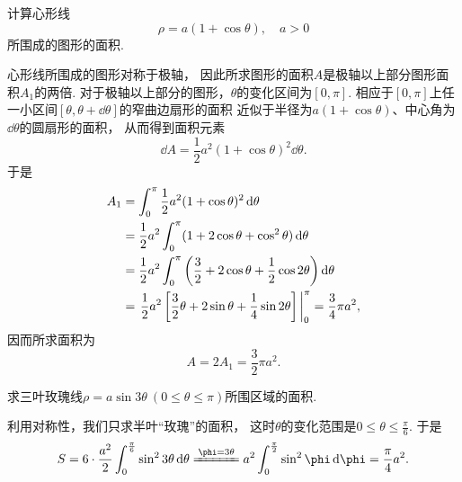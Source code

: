 \begin{example}
计算心形线\begin{equation*}
	\rho = a (1 + \cos\theta), \quad a>0
\end{equation*}所围成的图形的面积.
\begin{solution}
心形线所围成的图形对称于极轴，
因此所求图形的面积\(A\)是极轴以上部分图形面积\(A_1\)的两倍.
对于极轴以上部分的图形，\(\theta\)的变化区间为\([0,\pi]\).
相应于\([0,\pi]\)上任一小区间\([\theta,\theta+\dd{\theta}]\)的窄曲边扇形的面积
近似于半径为\(a (1 + \cos\theta)\)、中心角为\(\dd{\theta}\)的圆扇形的面积，
从而得到面积元素\begin{equation*}
	\dd{A} = \frac12 a^2 (1 + \cos\theta)^2 \dd{\theta}.
\end{equation*}
于是\begin{align*}
	A_1 &= \int_0^\pi \frac12 a^2 (1 + \cos\theta)^2 \dd{\theta} \\
	&= \frac12 a^2 \int_0^\pi (1 + 2\cos\theta + \cos^2\theta) \dd{\theta} \\
	&= \frac12 a^2 \int_0^\pi \left(\frac32 + 2 \cos\theta + \frac12 \cos2\theta\right) \dd{\theta} \\
	&= \eval{\frac12 a^2 \left[\frac32 \theta + 2 \sin\theta + \frac14 \sin2\theta\right]}_0^\pi
	= \frac34 \pi a^2,
\end{align*}
因而所求面积为\begin{equation*}
	A = 2 A_1 = \frac32 \pi a^2.
\end{equation*}
\end{solution}
\end{example}

\begin{example}
求三叶玫瑰线\(\rho = a \sin3\theta\ (0 \leq \theta \leq \pi)\)所围区域的面积.
\begin{solution}
利用对称性，我们只求半叶“玫瑰”的面积，
这时\(\theta\)的变化范围是\(0 \leq \theta \leq \frac\pi6\).
于是\begin{equation*}
	S = 6 \cdot \frac{a^2}2 \int_0^{\frac\pi6} \sin^23\theta \dd{\theta}
	\xlongequal{\phi=3\theta} a^2 \int_0^{\frac\pi2} \sin^2\phi \dd{\phi}
	= \frac\pi4 a^2.
\end{equation*}
\end{solution}
\end{example}


